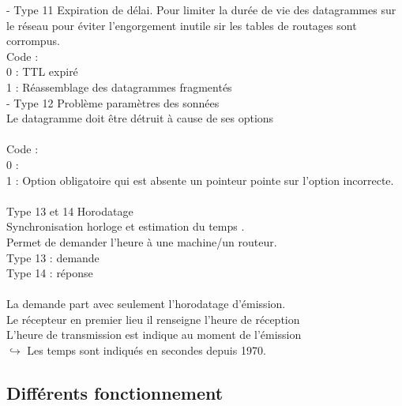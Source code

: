 \documentclass{article}
\begin{document}
- Type 11 Expiration de délai.
Pour limiter la durée de vie des datagrammes sur le réseau pour éviter l'engorgement inutile sir les tables de routages sont corrompus.
\\
Code : \\ 
0 : TTL expiré \\
1 : Réassemblage des datagrammes fragmentés 
\\
- Type 12 Problème paramètres des sonnées \\
Le datagramme doit être détruit à cause de ses options\\
\\

Code : \\
0 : \\
1 : Option obligatoire qui est absente un pointeur pointe sur l'option incorrecte. \\

\\

Type 13 et 14 Horodatage \\
Synchronisation horloge et estimation du temps . \\
Permet de demander l'heure à une machine/un routeur. \\
Type 13 : demande \\
Type 14 : réponse \\
\\
La demande part avec seulement l'horodatage d'émission. \\
Le récepteur en premier lieu il renseigne l'heure de réception \\
L'heure de transmission est indique au moment de l'émission \\
$\hookrightarrow$ Les temps sont indiqués en secondes depuis 1970. 
\subsection{Différents fonctionnement}
\end{document}
